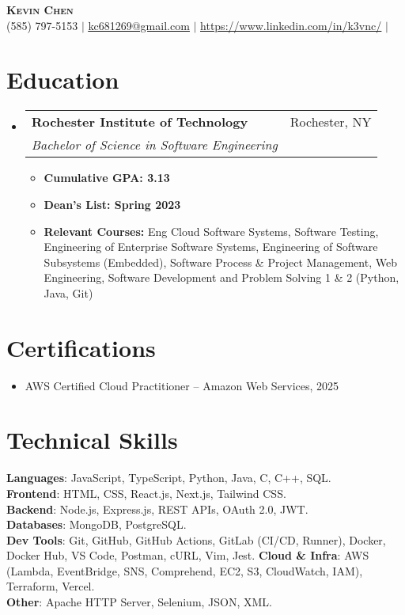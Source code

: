 \documentclass[letterpaper,11pt]{article}
\makeatletter
\newcommand{\resumeItem}[1]{
  \item\small{
    {#1 \vspace{-2pt}}
  }
}
\newcommand{\resumeSubheading}[4]{
  \vspace{-2pt}\item
    \begin{tabular*}{0.97\textwidth}[t]{l@{\extracolsep{\fill}}r}
      \textbf{#1} & #2 \\
      \textit{\small#3} & \textit{\small #4} \\
    \end{tabular*}\vspace{-7pt}
}
\newcommand{\resumeSubHeadingListStart}{\begin{itemize}[leftmargin=0.15in, label={}]}
\newcommand{\resumeSubHeadingListEnd}{\end{itemize}}
\newcommand{\resumeItemListStart}{\begin{itemize}}
\newcommand{\resumeItemListEnd}{\end{itemize}\vspace{-5pt}}
\makeatother
\begin{document}
\begin{center}
    \textbf{\Huge \scshape Kevin Chen} \\ \vspace{1pt}
    \small (585) 797-5153 $|$ \href{mailto:x@x.com}{\underline{kc681269@gmail.com}} $|$ 
    \href{https://linkedin.com/in/...}{\underline{https://www.linkedin.com/in/k3vnc/}} $|$
\end{center}

\section{Education}
  \resumeSubHeadingListStart
    \resumeSubheading
      {Rochester Institute of Technology}{Rochester, NY}
      {Bachelor of Science in Software Engineering}{}
      \resumeItemListStart
        \resumeItem{\textbf{Cumulative GPA: 3.13}}
        \resumeItem{\textbf{Dean's List: Spring 2023}}
        \resumeItem{\textbf{Relevant Courses:} Eng Cloud Software Systems, Software Testing, Engineering of Enterprise Software Systems, Engineering of Software Subsystems (Embedded), Software Process \& Project Management, Web Engineering, Software Development and Problem Solving 1 \& 2 (Python, Java, Git)}
      \resumeItemListEnd
  \resumeSubHeadingListEnd

\section{Certifications}
  \resumeSubHeadingListStart
    \resumeItem{AWS Certified Cloud Practitioner -- Amazon Web Services, 2025}
  \resumeSubHeadingListEnd

\section{Technical Skills}
\begin{itemize}[leftmargin=0.15in, label={}]
\small{\item{
\textbf{Languages}{: JavaScript, TypeScript, Python, Java, C, C++, SQL.} \\
\textbf{Frontend}{: HTML, CSS, React.js, Next.js, Tailwind CSS.} \\
\textbf{Backend}{: Node.js, Express.js, REST APIs, OAuth 2.0, JWT.} \\
\textbf{Databases}{: MongoDB, PostgreSQL.} \\
\textbf{Dev Tools}{: Git, GitHub, GitHub Actions, GitLab (CI/CD, Runner), Docker, Docker Hub, VS Code, Postman, cURL, Vim, Jest.}
\textbf{Cloud \& Infra}{: AWS (Lambda, EventBridge, SNS, Comprehend, EC2, S3, CloudWatch, IAM), Terraform, Vercel.} \\
\textbf{Other}{: Apache HTTP Server, Selenium, JSON, XML.}}}
\end{itemize}
\end{document}
